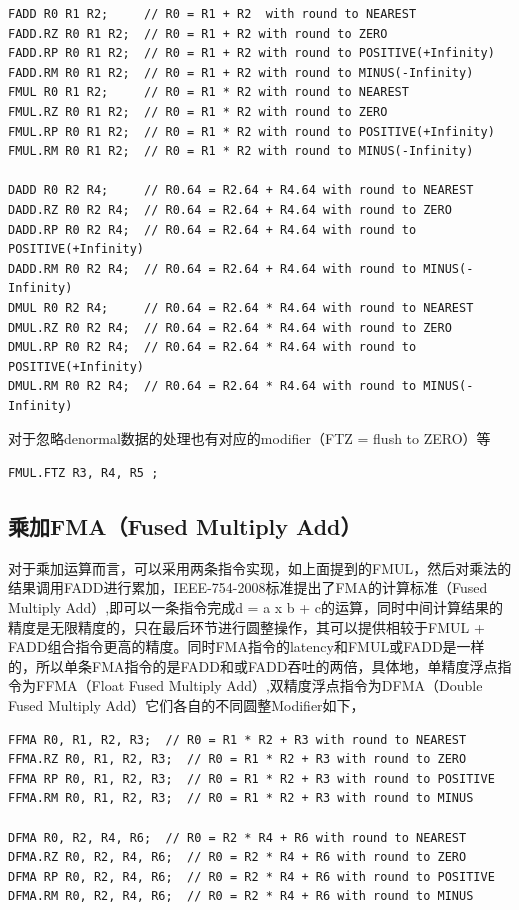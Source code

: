 \begin{lstlisting}
FADD R0 R1 R2;     // R0 = R1 + R2  with round to NEAREST
FADD.RZ R0 R1 R2;  // R0 = R1 + R2 with round to ZERO
FADD.RP R0 R1 R2;  // R0 = R1 + R2 with round to POSITIVE(+Infinity)
FADD.RM R0 R1 R2;  // R0 = R1 + R2 with round to MINUS(-Infinity)
FMUL R0 R1 R2;     // R0 = R1 * R2 with round to NEAREST
FMUL.RZ R0 R1 R2;  // R0 = R1 * R2 with round to ZERO
FMUL.RP R0 R1 R2;  // R0 = R1 * R2 with round to POSITIVE(+Infinity)
FMUL.RM R0 R1 R2;  // R0 = R1 * R2 with round to MINUS(-Infinity)

DADD R0 R2 R4;     // R0.64 = R2.64 + R4.64 with round to NEAREST
DADD.RZ R0 R2 R4;  // R0.64 = R2.64 + R4.64 with round to ZERO
DADD.RP R0 R2 R4;  // R0.64 = R2.64 + R4.64 with round to POSITIVE(+Infinity)
DADD.RM R0 R2 R4;  // R0.64 = R2.64 + R4.64 with round to MINUS(-Infinity)
DMUL R0 R2 R4;     // R0.64 = R2.64 * R4.64 with round to NEAREST
DMUL.RZ R0 R2 R4;  // R0.64 = R2.64 * R4.64 with round to ZERO
DMUL.RP R0 R2 R4;  // R0.64 = R2.64 * R4.64 with round to POSITIVE(+Infinity)
DMUL.RM R0 R2 R4;  // R0.64 = R2.64 * R4.64 with round to MINUS(-Infinity)
\end{lstlisting}

对于忽略denormal数据的处理也有对应的modifier（FTZ = flush to ZERO）等

\begin{lstlisting}
FMUL.FTZ R3, R4, R5 ;
\end{lstlisting}

\subsection{乘加FMA（Fused Multiply Add）}

对于乘加运算而言，可以采用两条指令实现，如上面提到的FMUL，然后对乘法的结果调用FADD进行累加，IEEE-754-2008标准提出了FMA的计算标准（Fused Multiply Add）,即可以一条指令完成d = a x b + c的运算，同时中间计算结果的精度是无限精度的，只在最后环节进行圆整操作，其可以提供相较于FMUL + FADD组合指令更高的精度。同时FMA指令的latency和FMUL或FADD是一样的，所以单条FMA指令的是FADD和或FADD吞吐的两倍，具体地，单精度浮点指令为FFMA（Float Fused Multiply Add）,双精度浮点指令为DFMA（Double Fused Multiply Add）它们各自的不同圆整Modifier如下，

\begin{lstlisting}
FFMA R0, R1, R2, R3;  // R0 = R1 * R2 + R3 with round to NEAREST
FFMA.RZ R0, R1, R2, R3;  // R0 = R1 * R2 + R3 with round to ZERO
FFMA RP R0, R1, R2, R3;  // R0 = R1 * R2 + R3 with round to POSITIVE
FFMA.RM R0, R1, R2, R3;  // R0 = R1 * R2 + R3 with round to MINUS

DFMA R0, R2, R4, R6;  // R0 = R2 * R4 + R6 with round to NEAREST
DFMA.RZ R0, R2, R4, R6;  // R0 = R2 * R4 + R6 with round to ZERO
DFMA RP R0, R2, R4, R6;  // R0 = R2 * R4 + R6 with round to POSITIVE
DFMA.RM R0, R2, R4, R6;  // R0 = R2 * R4 + R6 with round to MINUS
\end{lstlisting}

